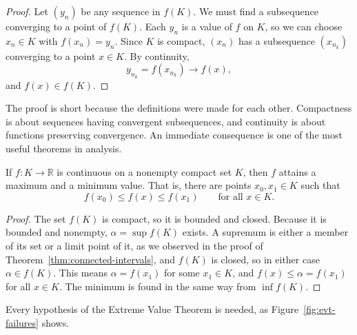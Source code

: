 \begin{proof}
Let $(y_n)$ be any sequence in $f(K)$.  We must find a subsequence converging to a point of $f(K)$.  Each $y_n$ is a value of $f$ on $K$, so we can choose $x_n \in K$ with $f(x_n) = y_n$.  Since $K$ is compact, $(x_n)$ has a subsequence $(x_{n_k})$ converging to a point $x \in K$.  By continuity,
\[ y_{n_k} = f(x_{n_k}) \to f(x), \]
and $f(x) \in f(K)$.
\end{proof}

The proof is short because the definitions were made for each other.  Compactness is about sequences having convergent subsequences, and continuity is about functions preserving convergence.  An immediate consequence is one of the most useful theorems in analysis.

\begin{theorem}\label{thm:evt}
If $f : K \to \mathbb{R}$ is continuous on a nonempty compact set $K$, then $f$ attains a maximum and a minimum value.  That is, there are points $x_0, x_1 \in K$ such that
\[ f(x_0) \leq f(x) \leq f(x_1) \qquad \text{for all } x \in K. \]
\end{theorem}

\begin{proof}
The set $f(K)$ is compact, so it is bounded and closed.  Because it is bounded and nonempty, $\alpha = \sup f(K)$ exists.  A supremum is either a member of its set or a limit point of it, as we observed in the proof of Theorem~\ref{thm:connected-intervals}, and $f(K)$ is closed, so in either case $\alpha \in f(K)$.  This means $\alpha = f(x_1)$ for some $x_1 \in K$, and $f(x) \leq \alpha = f(x_1)$ for all $x \in K$.  The minimum is found in the same way from $\inf f(K)$.
\end{proof}

Every hypothesis of the Extreme Value Theorem is needed, as Figure~\ref{fig:evt-failures} shows.

